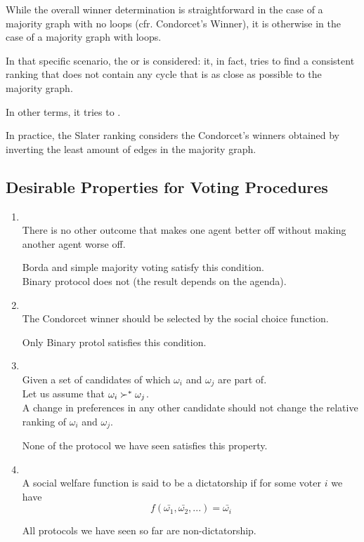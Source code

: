While the overall winner determination is straightforward in the case of a majority graph with no loops (cfr. Condorcet's Winner), it is otherwise in the case of a majority graph with loops.

In that specific scenario, the  or  is considered: it, in fact, tries to find a consistent ranking that does not contain any cycle that is as close as possible to the majority graph.

In other terms, it tries to .

In practice, the Slater ranking considers the Condorcet's winners obtained by inverting the least amount of edges in the majority graph.
\subsection{Desirable Properties for Voting Procedures}
\begin{enumerate}
\item {}\\
There is no other outcome that makes one agent better off without making another agent worse off.

Borda and simple majority voting satisfy this condition.\\
Binary protocol does not (the result depends on the agenda).
\item {}\\
The Condorcet winner should be selected by the social choice function.

Only Binary protol satisfies this condition.
\item {}\\
Given a set of candidates of which $\omega_i$ and $\omega_j$ are part of. \\
Let us assume that $\omega_i \succ^* \omega_j$.\\
A change in preferences in any other candidate should not change the relative ranking of $\omega_i$ and $\omega_j$.

None of the protocol we have seen satisfies this property.
\item {}\\
A social welfare function is said to be a dictatorship if for some voter $i$ we have
\[f(\bar{\omega_1}, \bar{\omega_2}, ...) = \bar{\omega_i}\]

All protocols we have seen so far are non-dictatorship.
\end{enumerate}

